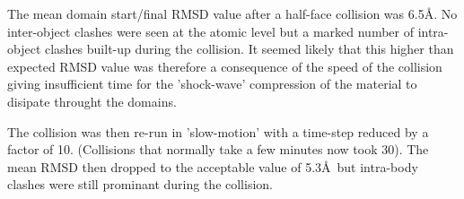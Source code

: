 The mean domain start/final RMSD value after a half-face collision was 6.5\AA.  No inter-object
clashes were seen at the atomic level but a marked number of intra-object clashes built-up
during the collision.   It seemed likely that this higher than expected RMSD value 
was therefore a consequence of the speed of the collision giving insufficient time for the
'shock-wave' compression of the material to disipate throught the domains.

The collision was then re-run in 'slow-motion' with a time-step reduced by a factor of 10.
(Collisions that normally take a few minutes now took 30).  The mean RMSD then dropped to
the acceptable value of 5.3\AA\ but intra-body clashes were still prominant during the collision.
